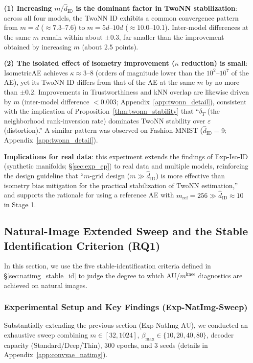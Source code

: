 \documentclass[make,article,submit,pdftex,moreauthors]{Definitions/mdpi}
\newcommand{\kap}{\kappa}
\newcommand{\mknee}{m^{\mathrm{knee}}}
\begin{document}
\textbf{(1) Increasing $m/\hat{d}_\mathrm{ID}$ is the dominant factor in TwoNN stabilization}:
across all four models, the TwoNN ID exhibits a common convergence pattern
from $m=d$ ($\approx 7.3$--7.6) to $m=5d$--$10d$ ($\approx 10.0$--10.1).
Inter-model differences at the same $m$ remain within about $\pm0.3$, far
smaller than the improvement obtained by increasing $m$ (about 2.5 points).

\textbf{(2) The isolated effect of isometry improvement ($\kap$ reduction) is small}:
IsometricAE achieves $\kap \approx 3$--8 (orders of magnitude lower than the
$10^2$--$10^7$ of the AE), yet its TwoNN ID differs from that of the AE at the
same $m$ by no more than $\pm 0.2$.
Improvements in Trustworthiness and kNN overlap are likewise driven by $m$
(inter-model difference $< 0.003$; Appendix~\ref{app:twonn_detail}),
consistent with the implication of Proposition~\ref{thm:twonn_stability} that
``$\delta_T$ (the neighborhood rank-inversion rate) dominates TwoNN stability
over $\varepsilon$ (distortion).''
A similar pattern was observed on Fashion-MNIST ($\hat{d}_\mathrm{ID}=9$;
Appendix~\ref{app:twonn_detail}).

\textbf{Implications for real data}:
this experiment extends the findings of Exp-Iso-ID (synthetic manifolds;
\S\ref{sec:exp_ep}) to real data and multiple models, reinforcing the design
guideline that ``$m$-grid design ($m \gg \hat{d}_\mathrm{ID}$) is more
effective than isometry bias mitigation for the practical stabilization of
TwoNN estimation,'' and supports the rationale for using a reference AE with
$m_\mathrm{ref}=256 \gg \hat{d}_\mathrm{ID} \approx 10$ in Stage 1.

\subsection{Natural-Image Extended Sweep and the Stable Identification Criterion (RQ1)}\label{sec:exp_natimg_sweep}

In this section, we use the five stable-identification criteria defined in
\S\ref{sec:natimg_stable_id} to judge the degree to which AU/$\mknee$
diagnostics are achieved on natural images.

\subsubsection*{Experimental Setup and Key Findings (Exp-NatImg-Sweep)}

Substantially extending the previous section (Exp-NatImg-AU), we conducted an
exhaustive sweep combining $m \in [32, 1024]$,
$\beta_{\max} \in \{10,20,40,80\}$, decoder capacity (Standard/Deep/Thin),
300 epochs, and 3 seeds (details in Appendix~\ref{app:convvae_natimg}).
\end{document}
